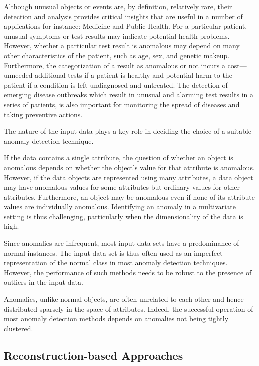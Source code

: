Although unusual objects or events are, by deﬁnition, relatively rare, their detection and analysis provides critical insights that are useful in a number of
applications for instance: Medicine and Public Health. For a particular patient, unusual symptoms or test results may indicate potential health problems. However, whether a particular test result is anomalous may depend on many other characteristics of the patient, such as age, sex, and genetic makeup. Furthermore, the categorization of a result as anomalous or not incurs a cost—unneeded additional tests if a patient is healthy and potential harm to the patient if a condition is left undiagnosed and untreated. The detection of emerging disease outbreaks which result in unusual and alarming test results in a series of patients, is also important for monitoring the spread of diseases and taking preventive actions.

The nature of the input data plays a key role in deciding the choice of a suitable anomaly detection technique.

If the data contains a single attribute, the question of whether an object is anomalous depends on whether the object’s value for that attribute is anomalous. However, if the data objects are represented using many attributes, a data object may have anomalous values for some attributes but ordinary values for other attributes. Furthermore, an object may be anomalous even if none of its attribute values are individually anomalous. Identifying an anomaly in a multivariate
setting is thus challenging, particularly when the dimensionality of the data is high.

Since anomalies are infrequent, most input data sets have a predominance of normal instances. The input data set is thus often used as an imperfect representation of the normal class in most anomaly detection techniques. However, the performance of such methods needs to be robust to the presence of outliers in the input data.

Anomalies, unlike normal objects, are often unrelated to each other and hence distributed sparsely in the space of attributes. Indeed, the successful operation of most anomaly detection methods depends on anomalies not being tightly clustered.

\subsection*{Reconstruction-based Approaches}\label{Reconstruction-based Approaches}

